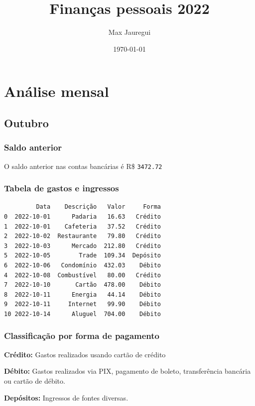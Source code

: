 \documentclass[11pt]{article}
\author{Max Jauregui}
\date{\today}
\title{Finanças pessoais 2022}
\begin{document}
\maketitle
\setcounter{tocdepth}{2}
\tableofcontents


\section{Análise mensal}
\label{sec:orga4978c0}

\subsection{Outubro}
\label{sec:org430390f}

\subsubsection{Saldo anterior}
\label{sec:orge9becb0}

O saldo anterior nas contas bancárias é R\$ \texttt{3472.72}

\subsubsection{Tabela de gastos e ingressos}
\label{sec:org7068882}

\begin{verbatim}
         Data    Descrição   Valor     Forma
0  2022-10-01      Padaria   16.63   Crédito
1  2022-10-01    Cafeteria   37.52   Crédito
2  2022-10-02  Restaurante   79.80   Crédito
3  2022-10-03      Mercado  212.80   Crédito
5  2022-10-05        Trade  109.34  Depósito
6  2022-10-06   Condomínio  432.03    Débito
4  2022-10-08  Combustível   80.00   Crédito
7  2022-10-10       Cartão  478.00    Débito
8  2022-10-11      Energia   44.14    Débito
9  2022-10-11     Internet   99.90    Débito
10 2022-10-14      Aluguel  704.00    Débito
\end{verbatim}

\subsubsection{Classificação por forma de pagamento}
\label{sec:org316baae}

\textbf{Crédito:} Gastos realizados usando cartão de crédito

\textbf{Débito:} Gastos realizados via PIX, pagamento de boleto, transferência bancária ou cartão de débito.

\textbf{Depósitos:} Ingressos de fontes diversas.
\end{document}
